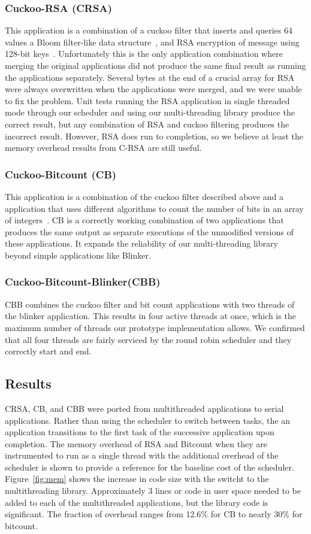 \documentclass[11pt]{sensys-proc}
\begin{document}
\subsubsection{Cuckoo-RSA (CRSA)}
This application is a combination of a cuckoo filter that inserts and queries 64
values a Bloom filter-like data structure~\cite{Chain}, and RSA encryption of message
using 128-bit keys~\cite{Chain}. Unfortunately this is the only application
combination where merging the original applications did not produce the same
final result as running the applications separately. Several bytes at the end of
a crucial array for RSA were always overwritten when the applications were
merged, and we were unable to fix the problem. Unit tests running the RSA
application in single threaded mode through our scheduler and using our
multi-threading library produce the correct result, but any combination of RSA
and cuckoo filtering produces the incorrect result. However, RSA does run to
completion, so we believe at least the memory overhead results from C-RSA are still useful.
\subsubsection{Cuckoo-Bitcount (CB)}
This application is a combination of the cuckoo filter described above and a
application that uses different algorithms to count the number of bits in an
array of integers~\cite{bitcount}. CB is a correctly working combination of two
applications that produces the same output as separate executions of the
unmodified versions of these applications. It expands the reliability of our
multi-threading library beyond simple applications like Blinker.
\subsubsection{Cuckoo-Bitcount-Blinker(CBB)}
CBB combines the cuckoo filter and bit count applications with two threads of
the blinker application. This results in four active threads at once, which is
the maximum number of threads our prototype implementation allows. We confirmed
that all four threads are fairly serviced by the round robin scheduler and they
correctly start and end.

\subsection{Results}
CRSA, CB, and CBB were ported from multithreaded applications to serial
applications. Rather than using the scheduler to switch between tasks, the an
application transitions to the first task of the successive application upon
completion. The memory overhead of RSA and Bitcount when they are instrumented
to run as a single thread with the additional overhead of the scheduler is shown
to provide a reference for the baseline cost of the scheduler.
Figure~\ref{fig:mem} shows the increase in code size with the switcht to the
multithreading library. Approximately 3 lines or code in user space needed to be
added to each of the multithreaded applications, but the library code is
significant. The fraction of overhead ranges from 12.6\% for CB to nearly 30\%
for bitcount.  
\end{document}
